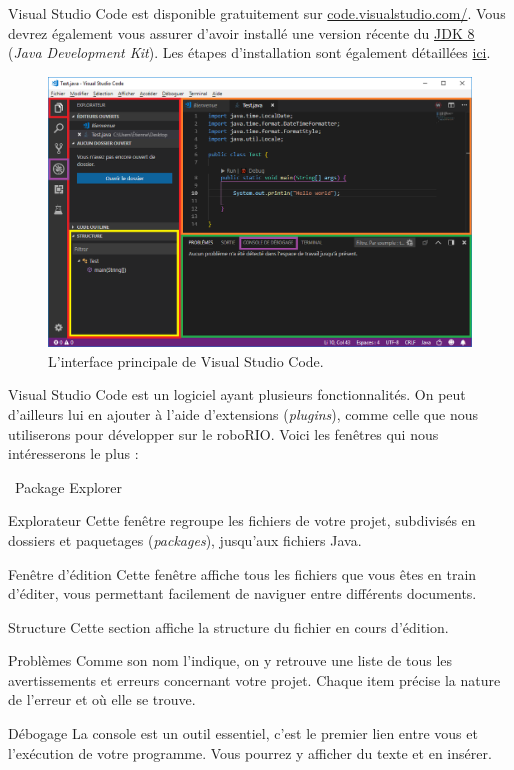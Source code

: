 \documentclass[12pt]{report}
\begin{document}
Visual Studio Code est disponible gratuitement sur \href{https://code.visualstudio.com/}{code.visualstudio.com/}. Vous devrez également vous assurer d'avoir installé une version récente du \href{http://www.oracle.com/technetwork/java/javase/downloads/index.html}{JDK 8} (\emph{Java Development Kit}). Les étapes d'installation sont également détaillées \href{http://wpilib.screenstepslive.com/s/currentCS/m/79833/l/932382-installing-vs-code}{ici}.

%
\begin{figure}[!htb]
  \centering
  \includegraphics[width=\textwidth]{vs-code-interface.png}
  \caption{L'interface principale de Visual Studio Code.}
\end{figure}
%
Visual Studio Code est un logiciel ayant plusieurs fonctionnalités. On peut d'ailleurs lui en ajouter à l'aide d'extensions (\emph{plugins}), comme celle que nous utiliserons pour développer sur le roboRIO. Voici les fenêtres qui nous intéresserons le plus :

\begin{labeling}{\ Package Explorer\ }
%
\item[\colorbox{ec-red}{Explorateur}] Cette fenêtre regroupe les fichiers de votre projet, subdivisés en dossiers et paquetages (\emph{packages}), jusqu'aux fichiers Java.
%
\item[\colorbox{ec-orange}{Fenêtre d'édition}] Cette fenêtre affiche tous les fichiers que vous êtes en train d'éditer, vous permettant facilement de naviguer entre différents documents.
%
\item[\colorbox{ec-yellow}{Structure}] Cette section affiche la structure du fichier en cours d'édition.
%
\item[\colorbox{ec-green}{Problèmes}] Comme son nom l'indique, on y retrouve une liste de tous les avertissements et erreurs concernant votre projet. Chaque item précise la nature de l'erreur et où elle se trouve.
%
\item[\colorbox{ec-purple}{Débogage}] La console est un outil essentiel, c'est le premier lien entre vous et l'exécution de votre programme. Vous pourrez y afficher du texte et en insérer.
\end{labeling}
\end{document}
